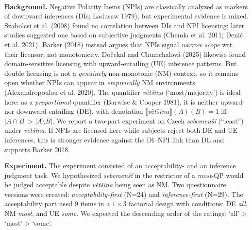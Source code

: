 \documentclass[12pt,a4paper]{article}
\begin{document}

\begin{center}{\vspace{-2ex}{\bf  Beyond Monotonicity: Czech NPI Licensing Under `majority'}}\\
\end{center}
\vspace{-1ex}
\noindent \textbf{Background.} Negative Polarity Items (NPIs) are classically analyzed as markers of downward inferences (DIs; Ladusaw 1979), but experimental evidence is mixed. Szabolcsi et al. (2008) found no correlation between DIs and NPI licensing; later studies suggested one based on subjective judgments (Chemla et al. 2011; Denić et al. 2021). Barker (2018) instead argues that NPIs signal \textit{narrow scope} wrt. their licensor, not monotonicity. Dočekal and Chumchalová (2025) likewise found domain-sensitive licensing with upward-entailing (UE) inference patterns. But double licensing is not a \textit{genuinely} non-monotonic (NM) context, so it remains open whether NPIs can appear in \textit{empirically} NM environments (Alexandropoulou et al. 2020). The quantifier \textit{většina} (`most/majority') is ideal here: as a \textit{proportional} quantifier (Barwise \& Cooper 1981), it is neither upward- nor downward-entailing (DE), with denotation $\llbracket\textit{většina}\rrbracket(A)(B)=1$ iff $|A\cap B|>|A\setminus B|$. We report a two-part experiment on Czech \textit{sebemenší} (“least”) under \textit{většina}. If NPIs are licensed here while subjects reject both DE and UE inferences, this is stronger evidence against the DI–NPI link than DL and supports Barker 2018.\vspace{-0.5mm}

\noindent \textbf{Experiment.} \noindent The experiment consisted of an acceptability- and an inference judgment task. We hypothesized \textit{sebemenší} in the restrictor of a \textit{most}-QP would be judged acceptable despite \textit{většina} being seen as NM. Two questionnaire versions were created: \textit{acceptability-first} (N=24) and \textit{inference-first} (N=29). The acceptability part used 9 items in a $1\times3$ factorial design with conditions: DE \textit{all}, NM \textit{most}, and UE \textit{some}. We expected the descending order of the ratings: `all' > `most' > `some'.
\end{document}
